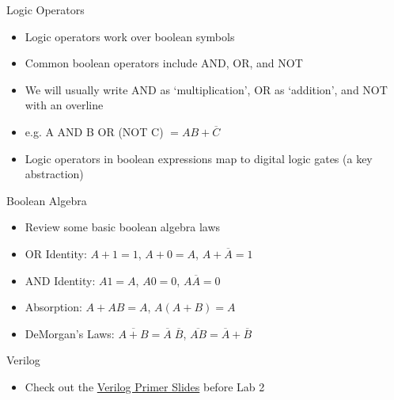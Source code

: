 \documentclass[12pt]{beamer}
\begin{document}

\begin{frame}{Logic Operators}
  \begin{itemize}
    \item Logic operators work over boolean symbols
    \item Common boolean operators include AND, OR, and NOT
    \item We will usually write AND as `multiplication', OR as `addition', and NOT with an overline
    \item e.g. A AND B OR (NOT C) $= AB + \overline{C}$
    \item Logic operators in boolean expressions map to digital logic gates (a key abstraction)
  \end{itemize}
\end{frame}

\begin{frame}{Boolean Algebra}
  \begin{itemize}
    \item Review some basic boolean algebra laws
    \item OR Identity: $A + 1 = 1$, $A + 0 = A$, $A + \overline{A} = 1$
    \item AND Identity: $A1 = A$, $A0 = 0$, $A\overline{A} = 0$
    \item Absorption: $A + AB = A$, $A(A + B) = A$
    \item DeMorgan's Laws: $\overline{A + B} = \overline{A}\; \overline{B}$, $\overline{AB} = \overline{A} + \overline{B}$
  \end{itemize}
\end{frame}

\begin{frame}{Verilog}
  \begin{itemize}
    \item Check out the \href{http://inst.eecs.berkeley.edu/~eecs151/fa19/files/verilog/Verilog_Primer_Slides.pdf}{Verilog Primer Slides} before Lab 2
  \end{itemize}
\end{frame}
\end{document}
